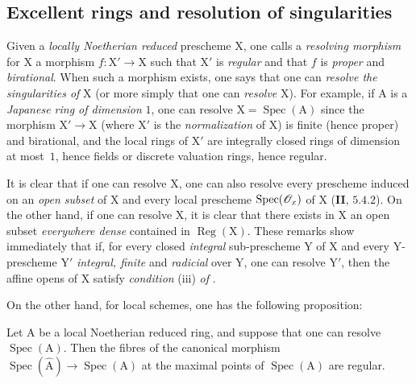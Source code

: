 \subsection{Excellent rings and resolution of singularities}
\label{subsection:IV.7.9}

\begin{env}[7.9.1]
\label{IV.7.9.1}
Given a \emph{locally Noetherian reduced} prescheme $\mathrm{X}$, one calls a \emph{resolving morphism} for $\mathrm{X}$ a morphism $f:\mathrm{X}'\to\mathrm{X}$ such that $\mathrm{X}'$ is \emph{regular} and that $f$ is \emph{proper} and \emph{birational}. When such a morphism exists, one says that one can \emph{resolve the singularities of} $\mathrm{X}$ (or more simply that one can \emph{resolve} $\mathrm{X}$). For example, if $\mathrm{A}$ is a \emph{Japanese ring of dimension} $1$, one can resolve $\mathrm{X}=\operatorname{Spec}(\mathrm{A})$ since the morphism $\mathrm{X}'\to\mathrm{X}$ (where $\mathrm{X}'$ is the \emph{normalization} of $\mathrm{X}$) is finite (hence proper) and birational, and the local rings of $\mathrm{X}'$ are integrally closed rings of dimension at most~$1$, hence fields or discrete valuation rings, hence regular.
\end{env}

\begin{env}[7.9.2]
\label{IV.7.9.2}
It is clear that if one can resolve $\mathrm{X}$, one can also resolve every prescheme induced on an \emph{open subset} of $\mathrm{X}$ and every local prescheme $\operatorname{Spec}(\mathscr{O}_x)$ of $\mathrm{X}$ (\textbf{II}, $5.4.2$). On the other hand, if one can resolve $\mathrm{X}$, it is clear that there exists in $\mathrm{X}$ an open subset \emph{everywhere dense} contained in $\operatorname{Reg}(\mathrm{X})$. These remarks show immediately that if, for every closed \emph{integral} sub-prescheme $\mathrm{Y}$ of $\mathrm{X}$ and every $\mathrm{Y}$-prescheme $\mathrm{Y}'$ \emph{integral, finite} and \emph{radicial} over $\mathrm{Y}$, one can resolve $\mathrm{Y}'$, then the affine opens of $\mathrm{X}$ satisfy \emph{condition} (iii) \emph{of} .

On the other hand, for local schemes, one has the following proposition:
\end{env}

\begin{proposition}[7.9.3]
\label{IV.7.9.3}
Let $\mathrm{A}$ be a local Noetherian reduced ring, and suppose that one can resolve $\operatorname{Spec}(\mathrm{A})$. Then the fibres of the canonical morphism $\operatorname{Spec}(\widehat{\mathrm{A}})\to\operatorname{Spec}(\mathrm{A})$ at the maximal points of $\operatorname{Spec}(\mathrm{A})$ are regular.
\end{proposition}

